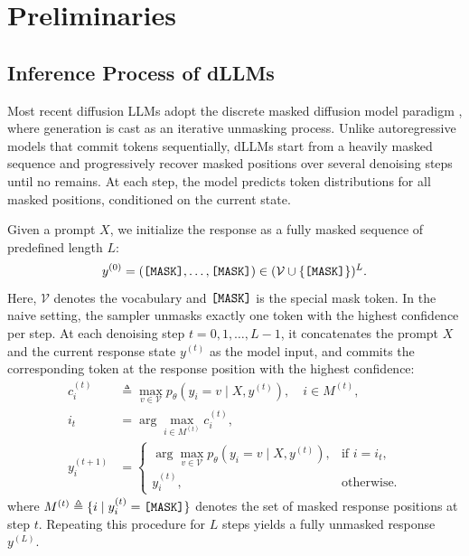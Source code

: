 \section{Preliminaries}
\subsection{Inference Process of dLLMs}
Most recent diffusion LLMs adopt the discrete masked diffusion model paradigm \cite{mdm1, mdm2}, where generation is cast as an iterative unmasking process. Unlike autoregressive models that commit tokens sequentially, dLLMs start from a heavily masked sequence and progressively recover masked positions over several denoising steps until no \mask{} remains. At each step, the model predicts token distributions for all masked positions, conditioned on the current state.

Given a prompt $X$, we initialize the response as a fully masked sequence of predefined length $L$:
\begin{equation*}
y^{(0)} = (\texttt{[MASK]}{},\ldots,\texttt{[MASK]}{}) \in (\mathcal{V}\cup\{\texttt{[MASK]}{}\})^L .
\end{equation*}
Here, $\mathcal{V}$ denotes the vocabulary and $\texttt{[MASK]}{}$ is the special mask token. In the naive setting, the sampler unmasks exactly one token with the highest confidence per step. At each denoising step $t=0,1,\ldots, L-1$, it concatenates the prompt $X$ and the current response state $y^{(t)}$ as the model input, and commits the corresponding token at the \mask{} response position with the highest confidence:
\begin{equation*}
\begin{aligned}
c_i^{(t)} &\triangleq \max_{v\in\mathcal{V}} p_{\theta}(y_i = v \mid X, y^{(t)}), \quad i\in M^{(t)},\\
i_t &= \arg\max_{i\in M^{(t)}} c_i^{(t)},\\
y_i^{(t+1)} &=
\begin{cases}
\displaystyle \arg\max_{v\in\mathcal{V}} p_{\theta}(y_i = v \mid X, y^{(t)}), & \text{if } i=i_t,\\
y_i^{(t)}, & \text{otherwise.}
\end{cases}
\end{aligned}
\end{equation*}
where $M^{(t)} \triangleq \{ i \mid y^{(t)}_{i}=\texttt{[MASK]}{} \}$ denotes the set of masked response positions at step $t$. Repeating this procedure for $L$ steps yields a fully unmasked response $y^{(L)}$.

